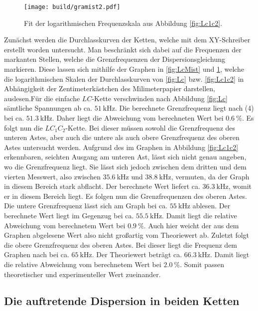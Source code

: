 	\begin{figure}
		\centering
		\caption{Fit der logarithmischen Frequenzskala aus Abbildung \ref{fig:Lc1c2}.}
		\texttt{[image: build/gramist2.pdf]}
		\label{fig:Lc1c2Mist}
	\end{figure}
  Zunächst werden die Durchlasskurven der Ketten, welche mit dem XY-Schreiber
   erstellt worden untersucht. Man beschränkt sich dabei auf die Frequenzen der
    markanten Stellen, welche die Grenzfrequenzen der Dispersionsgleichung
  	 markieren. Diese lassen sich mithilfe der Graphen in \ref{fig:LcMist} und \ref{fig:Lc1c2Mist},
      welche die logarithmischen Skalen der Durchlasskurven von \ref{fig:Lc} bzw. \ref{fig:Lc1c2} in Abhängigkeit der Zentimeterkästchen des Milimeterpapier darstellen, auslesen.Für die einfache $LC$-Kette verschwinden nach Abbildung \ref{fig:Lc} sämtliche Spannungen ab ca.
	  $\SI{51}{\kilo\hertz}$. Die berechnete Grenzfrequenz liegt nach (4) bei
		 ca. $\SI{51,3}{\kilo\hertz}$. Daher liegt die Abweichung vom berechneten Wert bei $\SI{0.6}{\percent}$. Es folgt nun die $LC_1C_2$-Kette. Bei dieser müssen
			 sowohl die Grenzfrequenz des unteren Astes, aber auch die untere als auch obere Grenzfrequenz des
			  oberen Astes untersucht werden.
         Aufgrund des im Graphen in Abbildung \ref{fig:Lc1c2} erkennbaren, seichten
				Ausgang am unteren Ast, lässt sich nicht genau angeben, wo die
				 Grenzfrequenz liegt. Sie lässt sich jedoch zwischen dem dritten
				  und dem vierten Messwert, also zwischen $\SI{35,6}{\kilo\hertz}$ und
					$\SI{38,8}{\kilo\hertz}$, vermuten, da der Graph in diesem Bereich
					 stark abflacht. Der berechnete Wert liefert ca. $\SI{36,3}{\kilo\hertz}$,
					  womit er in diesem Bereich liegt.
						 Es folgen nun die Grenzfrequenzen des oberen Astes. Die
						  untere Grenzfrequenz lässt sich am Graph bei ca. $\SI{55}{\kilo\hertz}$
							ablesen. Der berechnete Wert liegt im Gegenzug bei
							 ca. $\SI{55,5}{\kilo\hertz}$. Damit liegt die relative Abweichung vom berechnetem Wert bei $\SI{0.9}{\percent}$. Auch hier weicht der aus dem Graphen abgelesene Wert also nicht
							 großartig vom Theoriewert ab. Zuletzt folgt die obere Grenzfrequenz
							 des oberen Astes. Bei dieser liegt die Frequenz dem Graphen nach bei ca.
							  $\SI{65}{\kilo\hertz}$. Der Theoriewert beträgt ca. $\SI{66,3}{\kilo\hertz}$. Damit liegt die relative Abweichung vom berechnetem Wert bei $\SI{2.0}{\percent}$.
							Somit passen theoretischer und experimenteller Wert zueinander.
\subsection{Die auftretende Dispersion in beiden Ketten}
